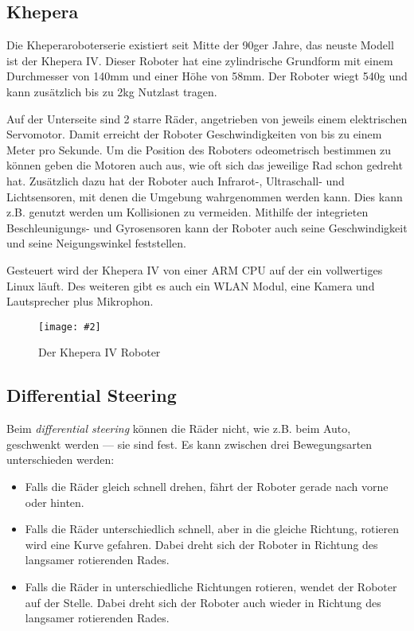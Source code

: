 \documentclass[
    12pt,
    bibliography=totoc,
    ngerman,
    enabledeprecatedfontcommands
]{scrartcl}
\newcommand{\includevisio}[2][]{\texttt{[image: \#2]}}
\begin{document}
\subsection{Khepera}\label{kephera}
Die Kheperaroboterserie existiert seit Mitte der 90ger Jahre, das neuste Modell ist der Khepera IV. Dieser Roboter hat eine zylindrische Grundform mit einem Durchmesser von 140mm und einer
H{\"{o}}he von 58mm. Der Roboter wiegt 540g und kann zus{\"{a}}tzlich bis zu 2kg Nutzlast tragen.

Auf der Unterseite sind 2 starre R{\"{a}}der, angetrieben von jeweils einem elektrischen Servomotor. Damit erreicht der Roboter Geschwindigkeiten von bis zu einem Meter pro Sekunde.
Um die Position des Roboters odeometrisch bestimmen zu k{\"{o}}nnen geben die Motoren auch aus, wie oft sich das jeweilige Rad schon gedreht hat. Zus{\"{a}}tzlich dazu hat der Roboter
auch Infrarot-, Ultraschall- und Lichtsensoren, mit denen die Umgebung wahrgenommen werden kann. Dies kann z.B. genutzt werden um Kollisionen zu vermeiden.
Mithilfe der integrieten Beschleunigungs- und Gyrosensoren kann der Roboter auch seine Geschwindigkeit und seine Neigungswinkel feststellen.

Gesteuert wird der Khepera IV von einer ARM CPU auf der ein vollwertiges Linux l{\"{a}}uft. Des weiteren gibt es auch ein WLAN Modul, eine Kamera und Lautsprecher plus Mikrophon.

\begin{figure}
	\centering
	\includevisio{k4-detail1.png}
	\caption{Der Khepera IV Roboter}
	\label{fig:kheperaiv}
\end{figure}

\subsection{Differential Steering}
Beim \textit{differential steering} k{\"{o}}nnen die R{\"{a}}der nicht, wie z.B. beim Auto, geschwenkt werden --- sie sind fest. Es kann zwischen drei Bewegungsarten unterschieden werden:
\begin{itemize}
\item Falls die R{\"{a}}der gleich schnell drehen, f{\"{a}}hrt der Roboter gerade nach vorne oder hinten.
\item Falls die R{\"{a}}der unterschiedlich schnell, aber in die gleiche Richtung, rotieren wird eine Kurve gefahren. Dabei dreht sich der Roboter in Richtung des langsamer rotierenden Rades.
\item Falls die R{\"{a}}der in unterschiedliche Richtungen rotieren, wendet der Roboter auf der Stelle. Dabei dreht sich der Roboter auch wieder in Richtung des langsamer rotierenden Rades.
\end{itemize}
\end{document}
